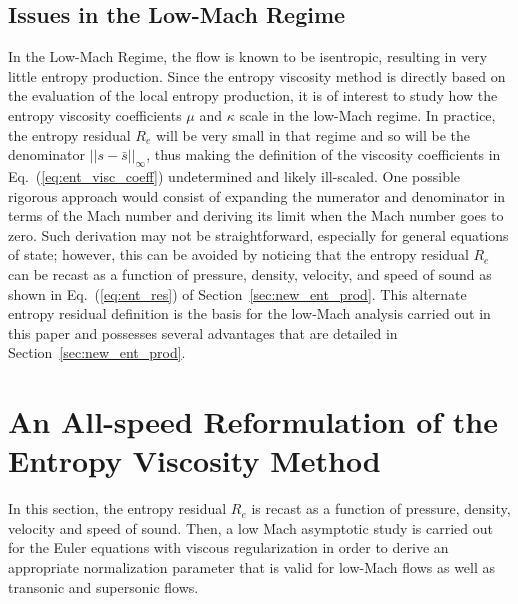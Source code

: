 \documentclass[preprint,10pt]{elsarticle}
\newcommand{\resi}{R_e}
\newcommand{\eqt}[1]{Eq.~(\ref{#1})}                     %
\newcommand{\sct}[1]{Section~\ref{#1}}                   %
\begin{document}
\subsection{Issues in the Low-Mach Regime} 

In the Low-Mach Regime, the flow is known to be isentropic, resulting in very little entropy production. Since the entropy viscosity method is directly based on the evaluation of the local entropy production, it is of interest to study how the entropy viscosity coefficients $\mu$ and $\kappa$ scale in the low-Mach regime. In practice, the entropy residual $\resi$ will be very small in that regime and so will be the denominator $|| s - \bar{s} ||_\infty$, thus making the definition of the viscosity coefficients in \eqt{eq:ent_visc_coeff} undetermined and likely ill-scaled.  One possible rigorous approach would consist of expanding the numerator and denominator in terms of the Mach number and deriving its limit when the Mach number goes to zero. Such derivation may not be straightforward, especially for general equations of state; however, this can be avoided by noticing that the entropy residual $\resi$ can be recast as a function of pressure, density, velocity, and speed of sound as shown in \eqt{eq:ent_res} of \sct{sec:new_ent_prod}. This alternate entropy residual definition is the basis for the low-Mach analysis carried out in this paper and possesses several advantages that are detailed in \sct{sec:new_ent_prod}.

\section{An All-speed Reformulation of the Entropy Viscosity Method} \label{sec:extension}

In this section, the entropy residual $\resi$ is recast as a function of pressure, density, velocity and speed of sound. Then, a low Mach asymptotic study is carried out for the Euler equations with viscous regularization in order to derive an appropriate  normalization parameter that is valid for low-Mach flows as well as transonic and supersonic flows. 
\end{document}
